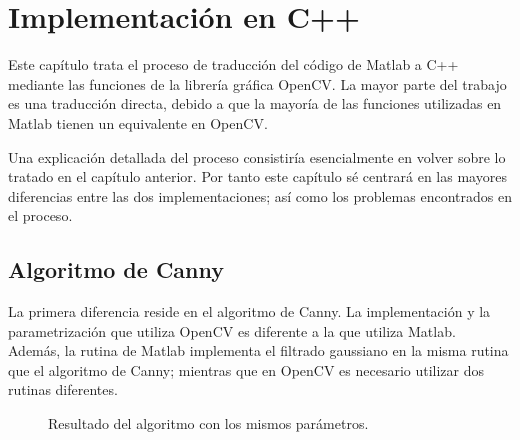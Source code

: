 \chapter{Implementación en C++}

Este capítulo trata el proceso de traducción del código de Matlab a C++ mediante las funciones de la librería gráfica OpenCV. La mayor parte del trabajo es una traducción directa, debido a que la mayoría de las funciones utilizadas en Matlab tienen un equivalente en OpenCV. 

Una explicación detallada del proceso consistiría esencialmente en volver sobre lo tratado en el capítulo anterior. Por tanto este capítulo sé centrará en las mayores diferencias entre las dos implementaciones; así como los problemas encontrados en el proceso.

\section{Algoritmo de Canny}
La primera diferencia reside en el algoritmo de Canny. La implementación y la parametrización que utiliza OpenCV es diferente a la que utiliza Matlab. Además, la rutina de Matlab implementa el filtrado gaussiano en la misma rutina que el algoritmo de Canny; mientras que en OpenCV es necesario utilizar dos rutinas diferentes.\\

\begin{figure}[!h]
\centering 
{}
\caption{\small{Resultado del algoritmo con los mismos parámetros.}} \label{CannyOpenCV}
\end{figure}

